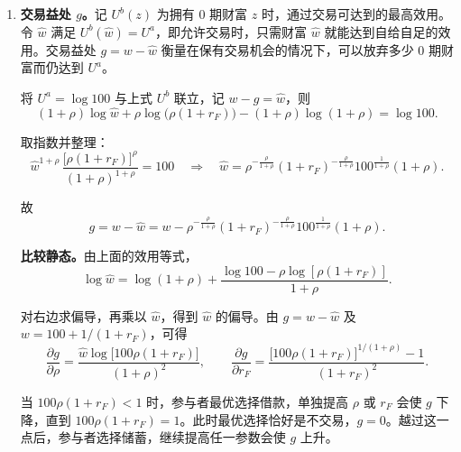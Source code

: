 \begin{solution}[blank-type=manual,blank-vsep=9\baselineskip]
\begin{enumerate}[label=(\alph*)]
    能交易时 \(S=0\) 仍可行，对应的消费还是 \((100,1)\)，效用仍是 \(\log 100=U^{a}\)。\(U^{b}\) 是所有可行储蓄里的最大效用，而 \(S=0\) 只是其中一个可行点，最大值不会低于这一点：
    \[
        U^{b}=\max_{-1/(1+r_F)<S<100}\,U\bigl(100-S,\,1+S(1+r_F)\bigr)
        \ge U(100,1)=U^{a}.
    \]

    由最优解的唯一性，等号当且仅当 $S^*=0$，即 $100\rho(1+r_F)=1$。

    \item \textbf{交易益处 $g$。}记 $U^b(z)$ 为拥有 0 期财富 $z$ 时，通过交易可达到的最高效用。令 $\hat w$ 满足 $U^b(\hat w)=U^a$，即允许交易时，只需财富 $\hat w$ 就能达到自给自足的效用。交易益处 $g=w-\hat w$ 衡量在保有交易机会的情况下，可以放弃多少 0 期财富而仍达到 $U^a$。

    将 $U^{a}=\log 100$ 与上式 $U^{b}$ 联立，记 $w-g=\hat w$，则
    \[
        (1+\rho)\log\hat w+\rho\log\bigl(\rho(1+r_F)\bigr)-(1+\rho)\log(1+\rho)=\log 100.
    \]

    取指数并整理：
    \[
        \hat w^{1+\rho}\,\frac{\bigl[\rho(1+r_F)\bigr]^{\rho}}{(1+\rho)^{1+\rho}}=100
        \quad\Rightarrow\quad
        \hat w=\rho^{-\frac{\rho}{1+\rho}}(1+r_F)^{-\frac{\rho}{1+\rho}}
        100^{\frac{1}{1+\rho}}(1+\rho).
    \]

    故
    \[
        g=w-\hat w
        =w-\rho^{-\frac{\rho}{1+\rho}}(1+r_F)^{-\frac{\rho}{1+\rho}}
        100^{\frac{1}{1+\rho}}(1+\rho).
    \]



    \textbf{比较静态。}由上面的效用等式，
    \[
        \log\hat w=\log(1+\rho)
        +\frac{\log 100-\rho\log[\rho(1+r_F)]}{1+\rho}.
    \]

    对右边求偏导，再乘以 $\hat w$，得到 $\hat w$ 的偏导。由 $g=w-\hat w$ 及 $w=100+1/(1+r_F)$，可得
    \[
        \frac{\partial g}{\partial \rho}
        =\frac{\hat w\log\!\bigl[100\rho(1+r_F)\bigr]}{(1+\rho)^2},
        \qquad
        \frac{\partial g}{\partial r_F}
        =\frac{\bigl[100\rho(1+r_F)\bigr]^{1/(1+\rho)}-1}{(1+r_F)^2}.
    \]

    当 $100\rho(1+r_F)<1$ 时，参与者最优选择借款，单独提高 $\rho$ 或 $r_F$ 会使 $g$ 下降，直到 $100\rho(1+r_F)=1$。此时最优选择恰好是不交易，$g=0$。越过这一点后，参与者选择储蓄，继续提高任一参数会使 $g$ 上升。
\end{enumerate}
\end{solution}

